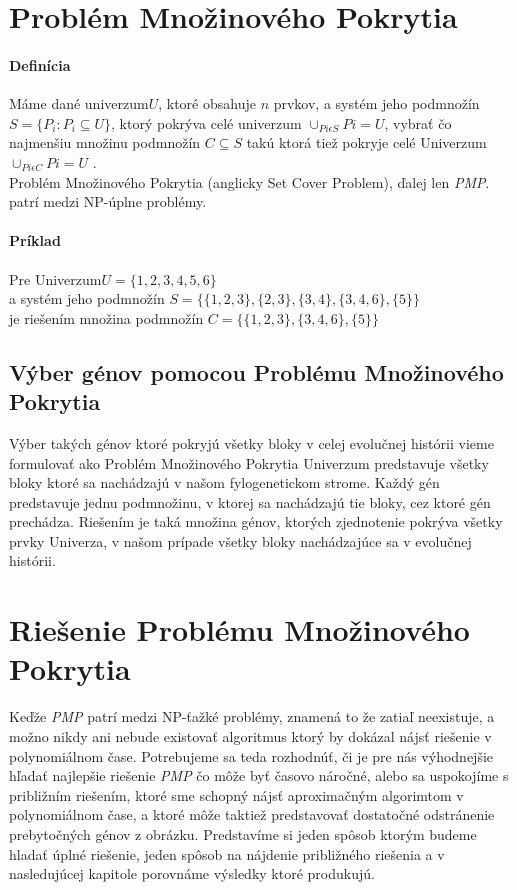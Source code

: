 \section{Problém Množinového Pokrytia}
\paragraph{Definícia}
Máme dané univerzum$U$, ktoré obsahuje $n$ prvkov, a systém jeho podmnožín \(S=\{ P_i : P_i \subseteq U \}\), 
ktorý pokrýva celé univerzum \(\cup_{Pi \epsilon S} Pi = U\),
vybrať čo najmenšiu množinu podmnožín \(C \subseteq S\)
takú ktorá tiež pokryje celé Univerzum \(\cup_{Pi \epsilon C} Pi = U \) .\\
Problém Množinového Pokrytia (anglicky Set Cover Problem), ďalej len \emph{PMP}. patrí medzi NP-úplne problémy.\cite{Karp}
\paragraph{Príklad}
Pre Univerzum$U=\{1,2,3,4,5,6\}$ \\a systém jeho podmnožín
$S=\{\{1,2,3\},\{2,3\},\{3,4\},\{3,4,6\},\{5\}\}$ \\
je riešením množina podmnožín $C=\{\{1,2,3\},\{3,4,6\},\{5\}\}$ 
\subsection{Výber génov pomocou Problému Množinového Pokrytia}
Výber takých génov ktoré pokryjú všetky bloky v celej evolučnej histórii vieme formulovať
ako Problém Množinového Pokrytia 
Univerzum predstavuje všetky bloky ktoré sa nachádzajú v našom fylogenetickom strome.
Každý gén predstavuje jednu podmnožinu, v ktorej sa nachádzajú tie bloky, cez ktoré gén prechádza.
Riešením je taká množina génov, ktorých zjednotenie pokrýva všetky prvky Univerza, v našom prípade všetky bloky nachádzajúce sa v evolučnej histórii.
\section{Riešenie Problému Množinového Pokrytia}
Keďže \emph{PMP} patrí medzi NP-ťažké problémy, znamená to že zatiaľ neexistuje,
a možno nikdy ani nebude existovať algoritmus ktorý by dokázal nájsť riešenie v polynomiálnom čase.
Potrebujeme sa teda rozhodnúť, či je pre nás výhodnejšie hľadať najlepšie riešenie \emph{PMP} 
čo môže byť časovo náročné,
alebo sa uspokojíme s približním riešením, ktoré sme schopný nájsť aproximačným algorimtom v polynomiálnom čase,
a ktoré môže taktiež predstavovať dostatočné odstránenie prebytočných génov z obrázku.
Predstavíme si jeden spôsob ktorým budeme hladať úplné riešenie, jeden spôsob na nájdenie približného riešenia a v
nasledujúcej kapitole porovnáme výsledky ktoré produkujú. 
